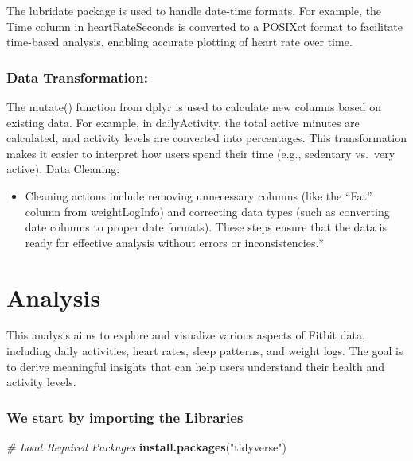 \documentclass[
]{article}
\newenvironment{Shaded}{\begin{snugshade}}{\end{snugshade}}
\newcommand{\CommentTok}[1]{\textcolor[rgb]{0.56,0.35,0.01}{\textit{#1}}}
\newcommand{\FunctionTok}[1]{\textcolor[rgb]{0.13,0.29,0.53}{\textbf{#1}}}
\newcommand{\NormalTok}[1]{#1}
\newcommand{\StringTok}[1]{\textcolor[rgb]{0.31,0.60,0.02}{#1}}
\providecommand{\tightlist}{%
  \setlength{\itemsep}{0pt}\setlength{\parskip}{0pt}}
\begin{document}
The lubridate package is used to handle date-time formats. For example,
the Time column in heartRateSeconds is converted to a POSIXct format to
facilitate time-based analysis, enabling accurate plotting of heart rate
over time.

\hypertarget{data-transformation}{%
\subsubsection{Data Transformation:}\label{data-transformation}}

The mutate() function from dplyr is used to calculate new columns based
on existing data. For example, in dailyActivity, the total active
minutes are calculated, and activity levels are converted into
percentages. This transformation makes it easier to interpret how users
spend their time (e.g., sedentary vs.~very active). Data Cleaning:

\begin{itemize}
\tightlist
\item
  Cleaning actions include removing unnecessary columns (like the
  ``Fat'' column from weightLogInfo) and correcting data types (such as
  converting date columns to proper date formats). These steps ensure
  that the data is ready for effective analysis without errors or
  inconsistencies.*
\end{itemize}

\hypertarget{analysis}{%
\section{Analysis}\label{analysis}}

This analysis aims to explore and visualize various aspects of Fitbit
data, including daily activities, heart rates, sleep patterns, and
weight logs. The goal is to derive meaningful insights that can help
users understand their health and activity levels.

\hypertarget{we-start-by-importing-the-libraries}{%
\subsubsection{We start by importing the
Libraries}\label{we-start-by-importing-the-libraries}}

\begin{Shaded}
\begin{Highlighting}[]
\CommentTok{\# Load Required Packages}
\FunctionTok{install.packages}\NormalTok{(}\StringTok{"tidyverse"}\NormalTok{)}
\end{Highlighting}
\end{Shaded}
\end{document}

